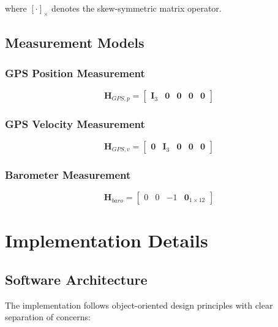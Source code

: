 \documentclass[12pt,a4paper]{article}
\begin{document}
where $[\cdot]_\times$ denotes the skew-symmetric matrix operator.

\subsection{Measurement Models}

\subsubsection{GPS Position Measurement}

\begin{equation}
\mathbf{H}_{GPS,p} = \begin{bmatrix} \mathbf{I}_3 & \mathbf{0} & \mathbf{0} & \mathbf{0} & \mathbf{0} \end{bmatrix}
\end{equation}

\subsubsection{GPS Velocity Measurement}

\begin{equation}
\mathbf{H}_{GPS,v} = \begin{bmatrix} \mathbf{0} & \mathbf{I}_3 & \mathbf{0} & \mathbf{0} & \mathbf{0} \end{bmatrix}
\end{equation}

\subsubsection{Barometer Measurement}

\begin{equation}
\mathbf{H}_{baro} = \begin{bmatrix} 0 & 0 & -1 & \mathbf{0}_{1\times12} \end{bmatrix}
\end{equation}

\section{Implementation Details}

\subsection{Software Architecture}

The implementation follows object-oriented design principles with clear separation of concerns:
\end{document}
